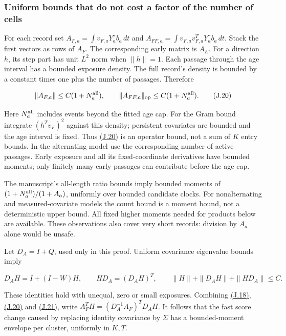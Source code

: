 \documentclass[11pt]{article}
\begin{document}
\subsubsection{Uniform bounds that do not cost a factor of the number of cells}\label{sec:J.6.1}

For each record set \(A_{F,a}=\int v_{F,a}Y_a^\tau b_a\,dt\) and \(A_{FF,a}=\int v_{F,a}v_{F,a}^TY_a^\tau b_a\,dt\). Stack the first vectors as rows of \(A_F\). The corresponding early matrix is \(A_E\). For a direction \(h\), its step part has unit \(L^2\) norm when \(\|h\|=1\). Each passage through the age interval has a bounded exposure density. The full record's density is bounded by a constant times one plus the number of passages. Therefore

\begin{equation*}
\|A_{F,a}\|\leq C(1+N_a^{\rm all}),\qquad
\|A_{FF,a}\|_{\rm op}\leq C(1+N_a^{\rm all}).
\tag{J.20}\label{eq:J.20}
\end{equation*}

Here \(N_a^{\rm all}\) includes events beyond the fitted age cap. For the Gram bound integrate \((h^Tv_F)^2\) against this density; persistent covariates are bounded and the age interval is fixed. Thus \hyperref[eq:J.20]{(J.20)} is an operator bound, not a sum of \(K\) entry bounds. In the alternating model use the corresponding number of active passages. Early exposure and all its fixed-coordinate derivatives have bounded moments; only finitely many early passages can contribute before the age cap.

The manuscript's all-length ratio bounds imply bounded moments of \((1+N_a^{\rm all})/(1+A_a)\), uniformly over bounded candidate clocks. For nonalternating and measured-covariate models the count bound is a moment bound, not a deterministic upper bound. All fixed higher moments needed for products below are available. These observations also cover very short records: division by \(A_a\) alone would be unsafe.

Let \(D_A=I+Q\), used only in this proof. Uniform covariance eigenvalue bounds imply

\begin{equation*}
D_AH=I+(I-W)H,\qquad HD_A=(D_AH)^T,\qquad
\|H\|+\|D_AH\|+\|HD_A\|\leq C.
\tag{J.21}\label{eq:J.21}
\end{equation*}

These identities hold with unequal, zero or small exposures. Combining \hyperref[eq:J.18]{(J.18)}, \hyperref[eq:J.20]{(J.20)} and \hyperref[eq:J.21]{(J.21)}, write
\(A_F^TH=(D_A^{-1}A_F)^TD_AH\). It follows that the fast score change caused by replacing identity covariance by \(\Sigma\) has a bounded-moment envelope per cluster, uniformly in \(K,T\).
\end{document}
